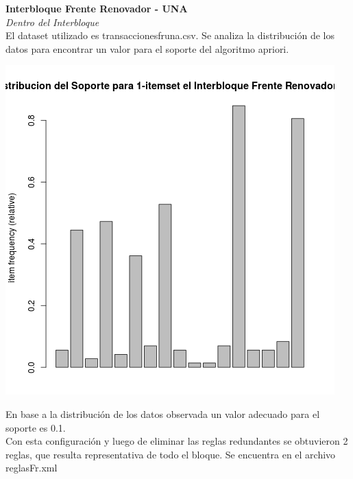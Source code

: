 \documentclass{endm}
\begin{document}
\textbf{Interbloque Frente Renovador - UNA}\\

\textit{Dentro del Interbloque} \\

El dataset utilizado es transaccionesfruna.csv. Se analiza la distribución de los datos para encontrar un valor para el soporte del algoritmo apriori. \\

\begin{center}
\includegraphics[scale=0.4]{graficos/soportesInterbloquesFrenteRenovador.png}
\end{center}

En base a la distribución de los datos observada un valor adecuado para el soporte es 0.1.\\

Con esta configuración y luego de eliminar las reglas redundantes se obtuvieron 2 reglas, que resulta representativa de todo el bloque. Se encuentra en el archivo reglasFr.xml  \\
\end{document}
